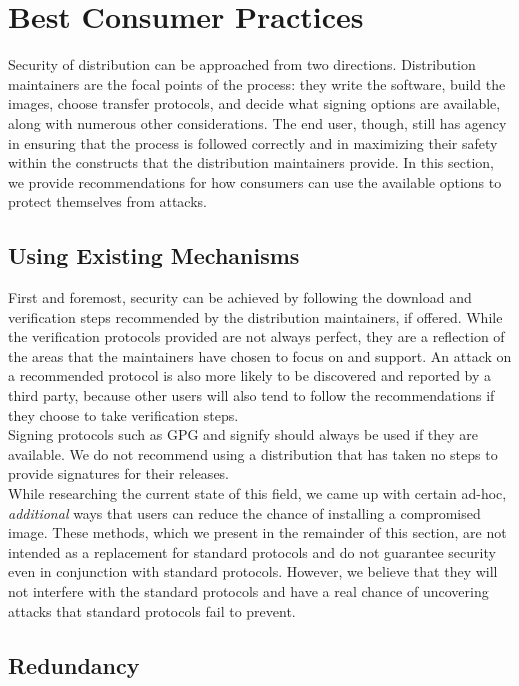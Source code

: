 \documentclass[conference]{IEEEtran}
\begin{document}
\section{Best Consumer Practices}

Security of distribution can be approached from two directions. Distribution
maintainers are the focal points of the process: they write the software, build the images,
choose transfer protocols, and decide what signing options are available, along with numerous
other considerations. The end user, though, still has agency in ensuring that the process is
followed correctly and in maximizing their safety within the constructs that the distribution
maintainers provide. In this section, we provide recommendations for how consumers can use
the available options to protect themselves from attacks.

\subsection{Using Existing Mechanisms}

First and foremost, security can be achieved by following the download and verification steps
recommended by the distribution maintainers, if offered. While the verification protocols
provided are not always perfect, they are a reflection of the areas that the maintainers have
chosen to focus on and support. An attack on a recommended protocol is also more likely to be
discovered and reported by a third party, because other users will also tend to follow the
recommendations if they choose to take verification steps.\\
\indent Signing protocols such as GPG and signify should always be used if they are
available. We do not recommend using a distribution that has taken no steps to provide
signatures for their releases.\\
\indent While researching the current state of this field, we came up with certain ad-hoc,
\emph{additional} ways that users can reduce the chance of installing a compromised image.
These methods, which we present in the remainder of this section, are not intended as a
replacement for standard protocols and do not guarantee security even in conjunction with
standard protocols. However, we believe that they will not interfere with the standard
protocols and have a real chance of uncovering attacks that standard protocols fail to
prevent.


\subsection{Redundancy\label{redundancy}}
\end{document}
